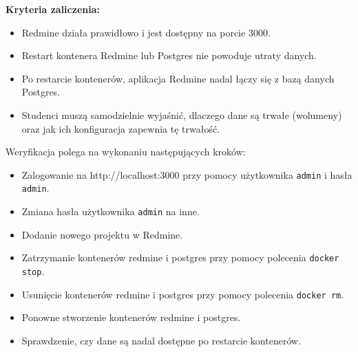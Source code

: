\documentclass{article}
\begin{document}
\textbf{Kryteria zaliczenia:}
\begin{itemize}
    \item Redmine działa prawidłowo i jest dostępny na porcie 3000.
    \item Restart kontenera Redmine lub Postgres nie powoduje utraty danych.
    \item Po restarcie kontenerów, aplikacja Redmine nadal łączy się z bazą danych Postgres.
    \item Studenci muszą samodzielnie wyjaśnić, dlaczego dane są trwałe (wolumeny) oraz jak ich konfiguracja zapewnia tę trwałość.
\end{itemize}
Weryfikacja polega na wykonaniu następujących kroków:
\begin{itemize}
    \item Zalogowanie na http://localhost:3000 przy pomocy użytkownika \texttt{admin} i hasła \texttt{admin}.
    \item Zmiana hasła użytkownika \texttt{admin} na inne.
    \item Dodanie nowego projektu w Redmine.
    \item Zatrzymanie kontenerów redmine i postgres przy pomocy polecenia \texttt{docker stop}.
    \item Usunięcie kontenerów redmine i postgres przy pomocy polecenia \texttt{docker rm}.
    \item Ponowne stworzenie kontenerów redmine i postgres.
    \item Sprawdzenie, czy dane są nadal dostępne po restarcie kontenerów.
\end{itemize}
\end{document}
